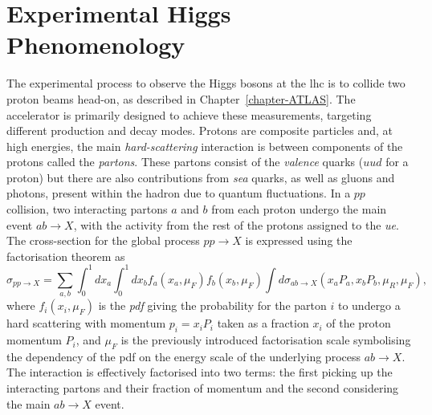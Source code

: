 \section{Experimental Higgs Phenomenology}\label{th-sec-higphe}
The experimental process to observe the Higgs bosons at the \gls{lhc} is to collide two proton beams head-on, as described in Chapter~\ref{chapter-ATLAS}. The accelerator is primarily designed to achieve these measurements, targeting different production and decay modes. Protons are composite particles and, at high energies, the main \textit{hard-scattering} interaction is between components of the protons called the \textit{partons}. These partons consist of the \textit{valence} quarks ($uud$ for a proton) but there are also contributions from \textit{sea} quarks, as well as gluons and photons, present within the hadron due to quantum fluctuations. In a $pp$ collision, two interacting partons $a$ and $b$ from each proton undergo the main event $ab \rightarrow X$, with the activity from the rest of the protons assigned to the \textit{\gls{ue}}. The cross-section for the global process $pp \rightarrow X$ is expressed using the factorisation theorem \cite{collins2004factorization} as 
\begin{equation}
\sigma_{pp\rightarrow X} = \sum_{a,b} \int_0^1 dx_a \int_0^1 dx_b f_a(x_a, \mu_F) f_b(x_b, \mu_F) \int d\sigma_{ab\rightarrow X}\left(x_aP_a, x_bP_b, \mu_R, \mu_F \right),
\end{equation}
where $f_i(x_i, \mu_F)$ is the \textit{\gls{pdf}} giving the probability for the parton $i$ to undergo a hard scattering with momentum $p_i = x_i P_i$ taken as a fraction $x_i$ of the proton momentum $P_i$, and $\mu_F$ is the previously introduced factorisation scale symbolising the dependency of the \gls{pdf} on the energy scale of the underlying process $ab \rightarrow X$. The interaction is effectively factorised into two terms: the first picking up the interacting partons and their fraction of momentum and the second considering the main $ab \rightarrow X$ event.\\

